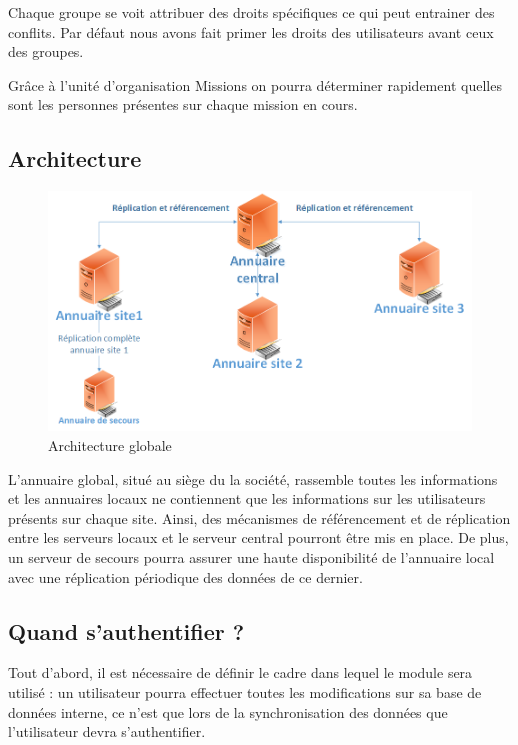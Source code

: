 Chaque groupe se voit attribuer des droits spécifiques ce qui peut entrainer des conflits. Par défaut nous avons fait primer les droits des utilisateurs avant ceux des groupes.

Grâce à l’unité d’organisation Missions on pourra déterminer rapidement quelles sont les personnes présentes sur chaque mission en cours.
\subsection{Architecture}
\begin{figure}[htbp]
	\centering
	\includegraphics[scale=0.6]{Images/SchemaGlobal.png}
	\caption{Architecture globale}
	\label{SchemaGlobal}
\end{figure}
L’annuaire global, situé au siège du la société, rassemble toutes les informations et les annuaires locaux ne contiennent que les informations sur les utilisateurs présents sur chaque site. Ainsi, des mécanismes de référencement et de réplication entre les serveurs locaux et le serveur central pourront être mis en place.
De plus, un serveur de secours pourra assurer une haute disponibilité de l’annuaire local avec une réplication périodique des données de ce dernier.
\subsection{Quand s'authentifier ?}
Tout d’abord, il est nécessaire de définir le cadre dans lequel le module sera utilisé : un utilisateur pourra effectuer toutes les modifications sur sa base de données interne, ce n’est que lors de la synchronisation des données que l’utilisateur devra s’authentifier.


